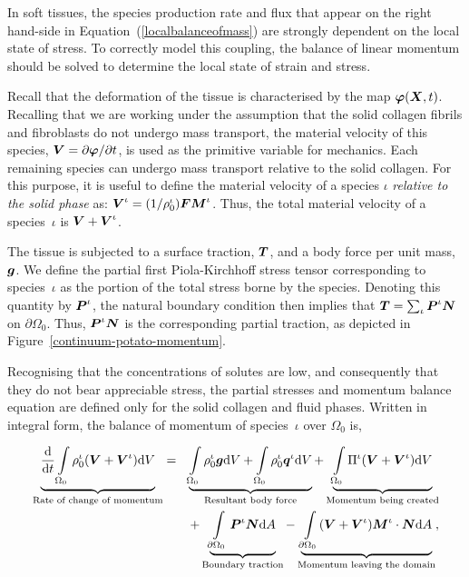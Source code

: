 In soft tissues, the species production rate and flux that appear on
the right hand-side in Equation~(\ref{localbalanceofmass}) are
strongly dependent on the local state of stress. To correctly model
this coupling, the balance of linear momentum should be solved to
determine the local state of strain and stress.

Recall that the deformation of the tissue is characterised by the map
$\mbox{\boldmath$\varphi$}(\mbox{\boldmath$ X$},t)$. Recalling that we are working under the assumption
that the solid collagen fibrils and fibroblasts do not undergo mass
transport, the material velocity of this species, $\mbox{\boldmath$ V$} = \partial
\mbox{\boldmath$\varphi$} / \partial t$, is used as the primitive variable for
mechanics. Each remaining species can undergo mass transport relative
to the solid collagen. For this purpose, it is useful to define the
material velocity of a species $\iota$ \emph{relative to the solid
  phase} as: $\mbox{\boldmath$ V$}^\iota = (1/\rho_0^\iota)\mbox{\boldmath$ F$}\mbox{\boldmath$ M$}^\iota$. Thus, the
total material velocity of a species~$\iota$ is $\mbox{\boldmath$ V$}+\mbox{\boldmath$ V$}^\iota$.

The tissue is subjected to a surface traction, $\mbox{\boldmath$ T$}$, and a body force
per unit mass, $\mbox{\boldmath$ g$}$. We define the partial first Piola-Kirchhoff
stress tensor corresponding to species~$\iota$ as the portion of the
total stress borne by the species. Denoting this quantity by
$\mbox{\boldmath$ P$}^\iota$, the natural boundary condition then implies that $\mbox{\boldmath$ T$} =
\sum_{\iota}\mbox{\boldmath$ P$}^\iota\mbox{\boldmath$ N$}$ on $\partial\Omega_0$. Thus, $\mbox{\boldmath$ P$}^\iota\mbox{\boldmath$ N$}$
is the corresponding partial traction, as depicted in
Figure~\ref{continuum-potato-momentum}.

Recognising that the concentrations of solutes are low, and
consequently that they do not bear appreciable stress, the partial
stresses and momentum balance equation are defined only for the solid
collagen and fluid phases. Written in integral form, the balance of
momentum of species~$\iota$ over $\Omega_0$ is,

\begin{eqnarray}
\underbrace{\frac{\mathrm{d}}{\mathrm{d}t} \int\limits_{\Omega_0}
  \rho_0^\iota(\mbox{\boldmath$ V$}+\mbox{\boldmath$ V$}^\iota) \mathrm{d}V}_{\text{Rate of change of
    momentum}} &=& \underbrace{\int\limits_{\Omega_0} \rho^\iota_0\mbox{\boldmath$ g$}
  \mathrm{d}V + \int\limits_{\Omega_0} \rho^\iota_0\mbox{\boldmath$ q$}^\iota
  \mathrm{d}V}_{\text{Resultant body force}} +
\underbrace{\int\limits_{\Omega_0} \Pi^\iota(\mbox{\boldmath$ V$}+\mbox{\boldmath$ V$}^\iota)
  \mathrm{d}V}_{\text{Momentum being created}} \nonumber\\ & &+
\underbrace{\int\limits_{\partial \Omega_0}\mbox{\boldmath$ P$}^\iota\mbox{\boldmath$ N$}
  \mathrm{d}A}_{\text{Boundary traction}} -
\underbrace{\int\limits_{\partial
    \Omega_0}(\mbox{\boldmath$ V$}+\mbox{\boldmath$ V$}^\iota)\mbox{\boldmath$ M$}^\iota\cdot\mbox{\boldmath$ N$}
  \mathrm{d}A}_{\text{Momentum leaving the domain}},
\label{globalbalanceofmomentum}
\end{eqnarray}

